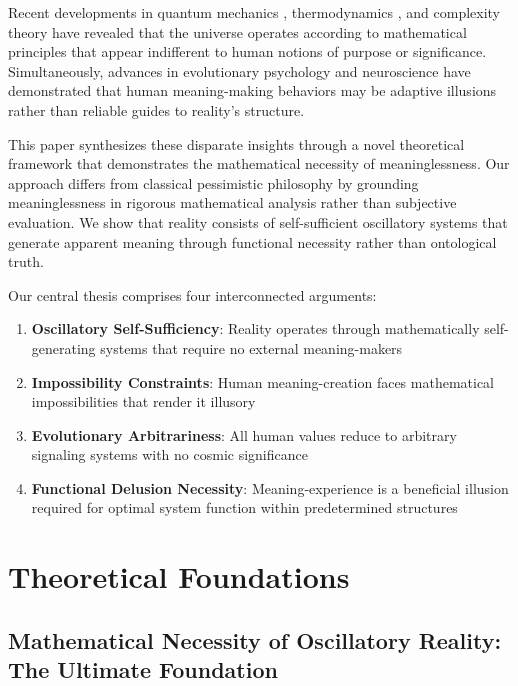 \documentclass[12pt,a4paper]{article}
\begin{document}
Recent developments in quantum mechanics \citep{tegmark2014our}, thermodynamics \citep{carroll2016big}, and complexity theory \citep{mitchell2009complexity} have revealed that the universe operates according to mathematical principles that appear indifferent to human notions of purpose or significance. Simultaneously, advances in evolutionary psychology \citep{buss2019evolutionary} and neuroscience \citep{harris2012free} have demonstrated that human meaning-making behaviors may be adaptive illusions rather than reliable guides to reality's structure.

This paper synthesizes these disparate insights through a novel theoretical framework that demonstrates the mathematical necessity of meaninglessness. Our approach differs from classical pessimistic philosophy \citep{schopenhauer2010world} by grounding meaninglessness in rigorous mathematical analysis rather than subjective evaluation. We show that reality consists of self-sufficient oscillatory systems that generate apparent meaning through functional necessity rather than ontological truth.

Our central thesis comprises four interconnected arguments:

\begin{enumerate}
\item \textbf{Oscillatory Self-Sufficiency}: Reality operates through mathematically self-generating systems that require no external meaning-makers
\item \textbf{Impossibility Constraints}: Human meaning-creation faces mathematical impossibilities that render it illusory
\item \textbf{Evolutionary Arbitrariness}: All human values reduce to arbitrary signaling systems with no cosmic significance
\item \textbf{Functional Delusion Necessity}: Meaning-experience is a beneficial illusion required for optimal system function within predetermined structures
\end{enumerate}

\section{Theoretical Foundations}

\subsection{Mathematical Necessity of Oscillatory Reality: The Ultimate Foundation}
\end{document}
